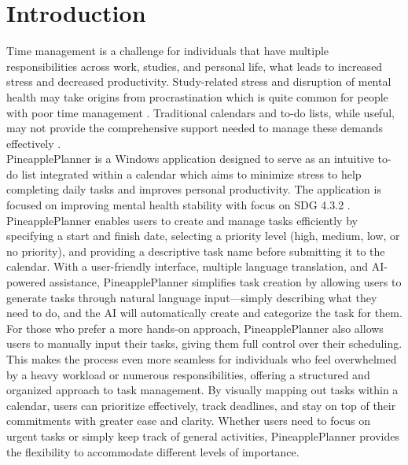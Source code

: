 \documentclass{article}
\begin{document}
\newpage

\tableofcontents
\thispagestyle{empty}

\newpage
\listoffigures
\lstlistoflistings
\listoftables

\newpage

\section{Introduction}
Time management is a challenge for individuals that have multiple responsibilities across work, studies, and personal life, what leads to increased stress and decreased productivity.
Study-related stress and disruption of mental health may take origins from procrastination which is quite common for people with poor time management \cite{ nayak2019impact}.
Traditional calendars and to-do lists, while useful, may not provide the comprehensive support needed to manage these demands effectively \cite{bek2014study}.\\
PineapplePlanner is a Windows application designed to serve as an intuitive to-do list integrated within a calendar which aims to minimize stress to help completing daily tasks and improves personal productivity. The application is focused on improving mental health stability with focus on SDG 4.3.2 \cite{worldhealthorganisation_2024_sdg}.
PineapplePlanner enables users to create and manage tasks efficiently by specifying a start and finish date, selecting a priority level (high, medium, low, or no priority), and providing a descriptive task name before submitting it to the calendar.
With a user-friendly interface, multiple language translation, and AI-powered assistance, PineapplePlanner simplifies task creation by allowing users to generate tasks through natural language input—simply describing what they need to do, and the AI will automatically create and categorize the task for them.
For those who prefer a more hands-on approach, PineapplePlanner also allows users to manually input their tasks, giving them full control over their scheduling. 
This makes the process even more seamless for individuals who feel overwhelmed by a heavy workload or numerous responsibilities, offering a structured and organized approach to task management. 
By visually mapping out tasks within a calendar, users can prioritize effectively, track deadlines, and stay on top of their commitments with greater ease and clarity.
Whether users need to focus on urgent tasks or simply keep track of general activities, PineapplePlanner provides the flexibility to accommodate different levels of importance.
\end{document}
